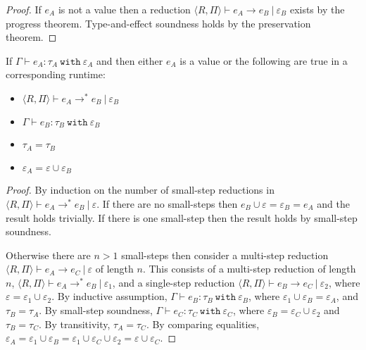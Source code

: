 \documentclass[a4paper,UKenglish]{lipics-v2016}
\newcommand{\kw}[1]{\mathtt{ #1 }~}
\newcommand{\multistep}[0]{ \longrightarrow^{*}}
\newcommand{\rctx}[0]{ \langle R, \Pi \rangle }
\begin{document}
\begin{proof}
If $e_A$ is not a value then a reduction $\rctx \vdash e_A \longrightarrow e_B~|~\varepsilon_B$ exists by the progress theorem. Type-and-effect soundness holds by the preservation theorem.
\end{proof}

\begin{theorem}
If $\Gamma \vdash e_A: \tau_A~\kw{with} \varepsilon_A$ and then either $e_A$ is a value or the following are true in a corresponding runtime:
\begin{itemize}
	\item $\rctx \vdash e_A \longrightarrow^{*} e_B~|~\varepsilon_B$
	\item $\Gamma \vdash e_B: \tau_B~\kw{with} \varepsilon_B$
	\item $\tau_A = \tau_B$
	\item $\varepsilon_A = \varepsilon \cup \varepsilon_B$
\end{itemize}
\end{theorem}

\begin{proof}
By induction on the number of small-step reductions in $\rctx \vdash e_A \multistep e_B~|~\varepsilon$. If there are no small-steps then $e_B \cup \varepsilon = \varepsilon_B = e_A$ and the result holds trivially. If there is one small-step then the result holds by small-step soundness.

Otherwise there are $n > 1$ small-steps then consider a multi-step reduction $\rctx \vdash e_A \longrightarrow e_C~|~\varepsilon$ of length $n$. This consists of a multi-step reduction of length $n$, $\rctx \vdash e_A \multistep e_B~|~\varepsilon_1$, and a single-step reduction $\rctx \vdash e_B \longrightarrow e_C~|~\varepsilon_2$, where $\varepsilon = \varepsilon_1 \cup \varepsilon_2$. By inductive assumption, $\Gamma \vdash e_B: \tau_B~\kw{with} \varepsilon_B$, where $\varepsilon_1 \cup \varepsilon_B = \varepsilon_A$, and $\tau_B = \tau_A$. By small-step soundness, $\Gamma \vdash e_C: \tau_C~\kw{with} \varepsilon_C$, where $\varepsilon_B = \varepsilon_C \cup \varepsilon_2$ and $\tau_B = \tau_C$. By transitivity, $\tau_A = \tau_C$. By comparing equalities, $\varepsilon_A = \varepsilon_1 \cup \varepsilon_B = \varepsilon_1 \cup \varepsilon_C \cup \varepsilon_2 = \varepsilon \cup \varepsilon_C$.

\end{proof}





\end{document}

